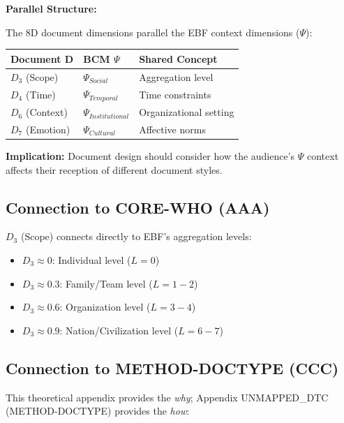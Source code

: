 \begin{tcolorbox}[colback=yellow!5!white, colframe=yellow!75!black,
    title=Integration: REF-DOCTYPE $\leftrightarrow$ CORE-WHEN]

\textbf{Parallel Structure:}

The 8D document dimensions parallel the EBF context dimensions ($\Psi$):

\begin{center}
\begin{tabular}{lll}
\textbf{Document D} & \textbf{BCM $\Psi$} & \textbf{Shared Concept} \\
\midrule
$D_3$ (Scope) & $\Psi_{Social}$ & Aggregation level \\
$D_4$ (Time) & $\Psi_{Temporal}$ & Time constraints \\
$D_6$ (Context) & $\Psi_{Institutional}$ & Organizational setting \\
$D_7$ (Emotion) & $\Psi_{Cultural}$ & Affective norms \\
\end{tabular}
\end{center}

\textbf{Implication:} Document design should consider how the audience's
$\Psi$ context affects their reception of different document styles.

\end{tcolorbox}

\subsection{Connection to CORE-WHO (AAA)}

$D_3$ (Scope) connects directly to EBF's aggregation levels:

\begin{itemize}[nosep]
\item $D_3 \approx 0$: Individual level ($L = 0$)
\item $D_3 \approx 0.3$: Family/Team level ($L = 1-2$)
\item $D_3 \approx 0.6$: Organization level ($L = 3-4$)
\item $D_3 \approx 0.9$: Nation/Civilization level ($L = 6-7$)
\end{itemize}

\subsection{Connection to METHOD-DOCTYPE (CCC)}

This theoretical appendix provides the \textit{why};
Appendix UNMAPPED_DTC (METHOD-DOCTYPE) provides the \textit{how}:

